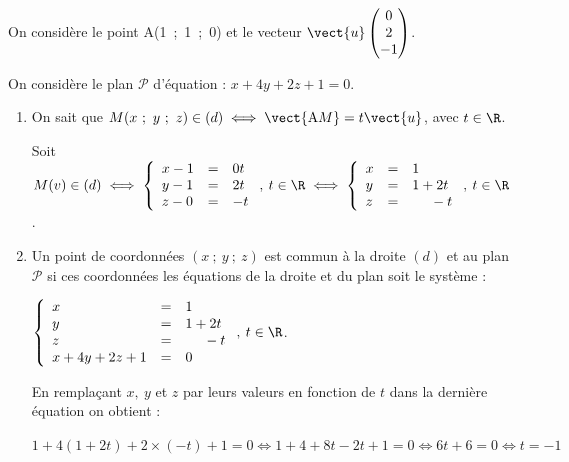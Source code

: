
\medskip


On considère le point A(1~;~1~;~0) et le vecteur $\vect{u}\begin{pmatrix}0\\2\\- 1\end{pmatrix}$.

On considère le plan $\mathcal{P}$ d'équation : $x + 4y + 2z + 1 = 0$.

\medskip

\begin{enumerate}
\item %

On sait que $M(x~;~y~;~z) \in (d) \iff \vect{\text{A}M} = t \vect{u}$, avec $t \in \R$.

Soit $M(v) \in (d) \iff \left\{\begin{array}{l c l}
x - 1&=&0t\\
y - 1&=&2t\\
z - 0&=&-t
\end{array}\right., \: t \in \R \iff \left\{\begin{array}{l c l}
x &=&1\\
y&=&1 + 2t\\
z&=&\phantom{1 + } -t
\end{array}\right., \: t \in \R$.
\item %
Un point de coordonnées $(x~;~y~;~z)$ est commun à la droite $(d)$ et au plan $\mathcal{P}$ si ces coordonnées les équations de la droite et du plan soit le système :

$\left\{\begin{array}{l c l}
x &=&1\\
y&=&1 + 2t\\
z&=&\phantom{1 + } -t\\
x + 4y + 2z + 1&=&0
\end{array}\right., \: t \in \R$.

En remplaçant $x, \:y$ et $z$ par leurs valeurs en fonction de $t$ dans la dernière équation on obtient :

$1 + 4(1 + 2t) + 2\times (- t) + 1 = 0 \iff 1 + 4 + 8t - 2t + 1 = 0 \iff 6t + 6 = 0 \iff t = - 1$


\end{enumerate}

